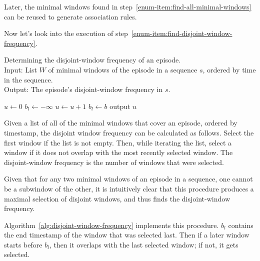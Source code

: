 Later, the minimal windows found in step~\ref{enum-item:find-all-minimal-windows} can be reused to generate association rules.

Now let's look into the execution of step~\ref{enum-item:find-disjoint-window-frequency}.

\begin{algorithm}

\caption{Determining the disjoint-window frequency of an episode.\\
Input: List $ W $ of minimal windows of the episode in a sequence $ s $, ordered by time in the sequence.\\
Output: The episode's disjoint-window frequency in $ s $.
}

\begin{algorithmic}[1]

\State $ u \gets 0 $
\State $ b_l \gets -\infty $
\ForAll {$ [a, b) \in W $}
        \State $ u \gets u + 1 $
        \State $ b_l \gets b $
    \EndIf
\EndFor
\State output $ u $

\end{algorithmic}

\label{alg:disjoint-window-frequency}
\end{algorithm}

Given a list of all of the minimal windows that cover an episode, ordered by timestamp, the disjoint window frequency can be calculated as follows. Select the first window if the list is not empty. Then, while iterating the list, select a window if it does not overlap with the most recently selected window. The disjoint-window frequency is the number of windows that were selected.

Given that for any two minimal windows of an episode in a sequence, one cannot be a subwindow of the other, it is intuitively clear that this procedure produces a maximal selection of disjoint windows, and thus finds the disjoint-window frequency.

Algorithm~\ref{alg:disjoint-window-frequency} implements this procedure. $ b_l $ contains the end timestamp of the window that was selected last. Then if a later window starts before $ b_l $, then it overlaps with the last selected window; if not, it gets selected.

